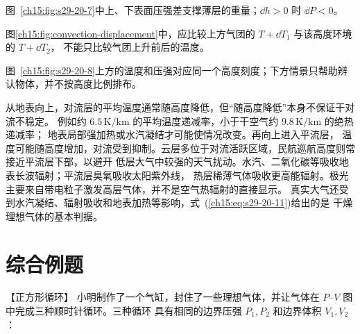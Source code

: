 {\par\noindent\begin{minipage}{\linewidth}
\pressureLayerRedraw
{}\label{ch15:fig:s29-20-7}
\end{minipage}\par\medskip
图~\ref{ch15:fig:s29-20-7}中上、下表面压强差支撑薄层的重量；$\dd h>0$ 时 $\dd P<0$。

\par\noindent\begin{minipage}{\linewidth}
\convectionCriterionDiagram
{}\label{ch15:fig:convection-displacement}
\end{minipage}\par\medskip
图\ref{ch15:fig:convection-displacement}中，应比较上方气团的 $T+\dd T_1$ 与该高度环境的 $T+\dd T_2$，
不能只比较气团上升前后的温度。

\par\noindent\begin{minipage}{\linewidth}
\atmosphereProfileFaithful
{}\label{ch15:fig:s29-20-8}
\end{minipage}\par\medskip
图~\ref{ch15:fig:s29-20-8}上方的温度和压强对应同一个高度刻度；下方情景只帮助辨认物体，并不按高度比例排布。

从地表向上，对流层的平均温度通常随高度降低，但“随高度降低”本身不保证干对流不稳定。
例如约 $6.5\,\mathrm{K/km}$ 的平均温度递减率，小于干空气约 $9.8\,\mathrm{K/km}$ 的绝热递减率；
地表局部强加热或水汽凝结才可能使情况改变。再向上进入平流层，
温度可能随高度增加，对流受到抑制。云层多位于对流活跃区域，民航巡航高度则常接近平流层下部，以避开
低层大气中较强的天气扰动。水汽、二氧化碳等吸收地表长波辐射；平流层臭氧吸收太阳紫外线，
热层稀薄气体吸收更高能辐射。极光主要来自带电粒子激发高层气体，并不是空气热辐射的直接显示。
真实大气还受到水汽凝结、辐射吸收和地表加热等影响，式~(\ref{ch15:eq:s29-20-11})给出的是
干燥理想气体的基本判据。



\section{综合例题}
\begin{origexamplebox}{【正方形循环】}\label{ch15:ex:s29-20-1}
小明制作了一个气缸，封住了一些理想气体，并让气体在 $P$--$V$ 图中完成三种顺时针循环。三种循环
具有相同的边界压强 $P_1,P_2$ 和边界体积 $V_1,V_2$：


\end{origexamplebox}}
